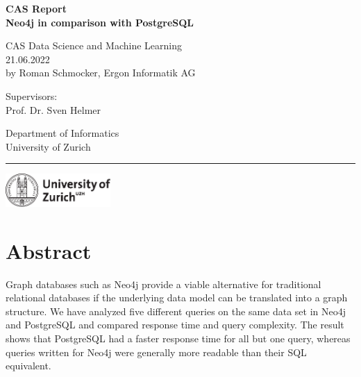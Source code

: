\documentclass[11pt, a4paper,oneside,chapterprefix=false]{scrbook}
\begin{document}
\frontmatter
\begin{titlepage}
	\setlength{\parindent}{0cm}
	\addtolength{\textheight}{1.0cm}
	\vspace{0.5cm}
	\sffamily\Huge
	{\textbf {CAS Report \\ Neo4j in comparison with PostgreSQL}}

	\vfill \vfill \vfill

	\vfill
	\textsf\Large
	CAS Data Science and Machine Learning \\[0.5cm]\large
	21.06.2022\\[0.5cm]
	\large
	by Roman Schmocker, Ergon Informatik AG

	\vfill \vfill \vfill
	\begin{minipage}[b]{0.5\textwidth}
	Supervisors: \\
	Prof. Dr. Sven Helmer
	\end{minipage}
	\begin{minipage}[b]{0.5\textwidth} \raggedleft
	Department of Informatics \\
	University of Zurich
	\end{minipage}

	\vfill
	\hrule
	\vspace{0.5cm}
	\includegraphics*[width=0.3\textwidth]{figures/uzh_logo} \hfill
\end{titlepage}


\chapter{Abstract} \label{chp:abstract}

Graph databases such as Neo4j provide a viable alternative for traditional relational databases if the underlying data model can be translated into a graph structure. 
We have analyzed five different queries on the same data set in Neo4j and PostgreSQL and compared response time and query complexity. 
The result shows that PostgreSQL had a faster response time for all but one query, whereas queries written for Neo4j were generally more readable than their SQL equivalent.
\end{document}
